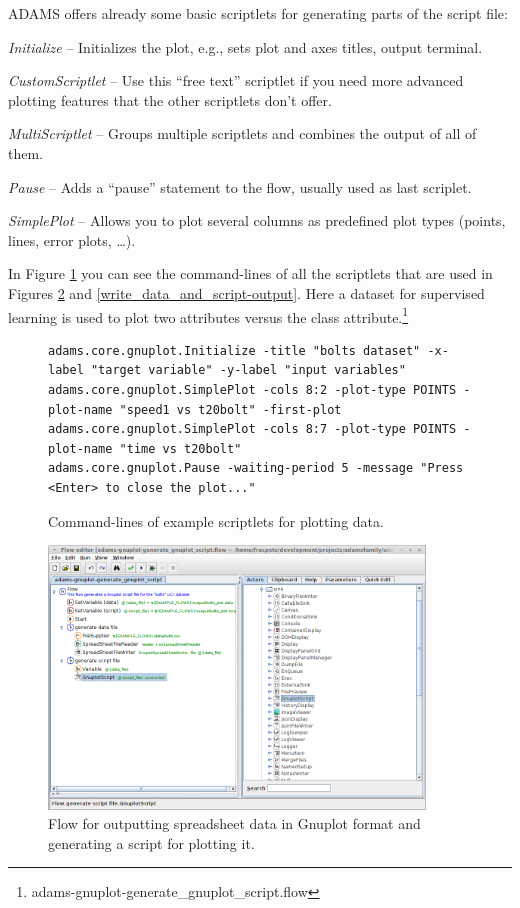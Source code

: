 \documentclass[a4paper]{book}
\begin{document}
ADAMS offers already some basic scriptlets for generating parts of the script
file:
\begin{tight_itemize}
	\item \textit{Initialize} -- Initializes the plot, e.g., sets plot and 
	axes titles, output terminal.
	\item \textit{CustomScriptlet} -- Use this ``free text'' scriptlet if you 
	need more advanced plotting features that the other scriptlets don't offer.
	\item \textit{MultiScriptlet} -- Groups multiple scriptlets and combines
	the output of all of them.
	\item \textit{Pause} -- Adds a ``pause'' statement to the flow, usually
	used as last scriplet.
	\item \textit{SimplePlot} -- Allows you to plot several columns as 
	predefined plot types (points, lines, error plots, \ldots).
\end{tight_itemize}
In Figure \ref{command-lines} you can see the command-lines of all the 
scriptlets that are used in Figures \ref{write_data_and_script-flow} 
and \ref{write_data_and_script-output}. Here a dataset for supervised
learning is used to plot two attributes versus the class 
attribute.\footnote{adams-gnuplot-generate\_gnuplot\_script.flow}

\begin{figure}[htb]
{\scriptsize
\begin{verbatim}
adams.core.gnuplot.Initialize -title "bolts dataset" -x-label "target variable" -y-label "input variables"
adams.core.gnuplot.SimplePlot -cols 8:2 -plot-type POINTS -plot-name "speed1 vs t20bolt" -first-plot
adams.core.gnuplot.SimplePlot -cols 8:7 -plot-type POINTS -plot-name "time vs t20bolt"
adams.core.gnuplot.Pause -waiting-period 5 -message "Press <Enter> to close the plot..."
\end{verbatim}
}
  \caption{Command-lines of example scriptlets for plotting data.}
  \label{command-lines}
\end{figure}

\begin{figure}[htb]
  \centering
  \includegraphics[width=10.0cm]{images/write_data_and_script-flow.png}
  \caption{Flow for outputting spreadsheet data in Gnuplot format and 
  generating a script for plotting it.}
  \label{write_data_and_script-flow}
\end{figure}
\end{document}
